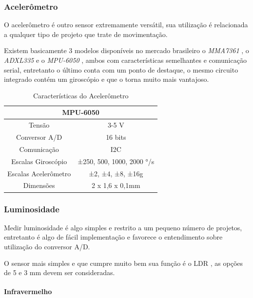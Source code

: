 \subsubsection*{Acelerômetro}
\label{sec:acel}

O acelerômetro é outro sensor extremamente versátil, sua utilização é relacionada a qualquer tipo de projeto que trate de movimentação.

Existem basicamente 3 modelos disponíveis no mercado brasileiro o \textit{MMA7361} \cite{FreescaleSemiconductor2011}, o \textit{ADXL335} \cite{AnalogDevices2009} e o \textit{MPU-6050} \cite{InvenSence2013}, ambos com características semelhantes e comunicação serial, entretanto o último conta com um ponto de destaque, o mesmo circuito integrado contém um giroscópio e que o torna muito mais vantajoso.

\begin{table}[h!]
\centering
\begin{tabular}{|c|c|}
\hline
\multicolumn{2}{|c|}{MPU-6050}                  \\ \hline
Tensão               & 3-5 V                    \\ \hline
Conversor A/D        & 16 bits                  \\ \hline
Comunicação          & I2C                      \\ \hline
Escalas Giroscópio   & ±250, 500, 1000, 2000 °/s \\ \hline
Escalas Acelerômetro & ±2, ±4, ±8, ±16g         \\ \hline
Dimensões            & 2 x 1,6 x 0,1mm          \\ \hline
\end{tabular}
\caption{Características do Acelerômetro}
\label{tab:acel}
\end{table}

\subsubsection*{Luminosidade}

Medir luminosidade é algo simples e restrito a um pequeno número de projetos, entretanto é algo de fácil implementação e favorece o entendimento sobre utilização do conversor A/D.

O sensor mais simples e que cumpre muito bem sua função é o LDR \cite{Technologies2008}, as opções de 5 e 3 mm devem ser consideradas.

\paragraph*{Infravermelho}

